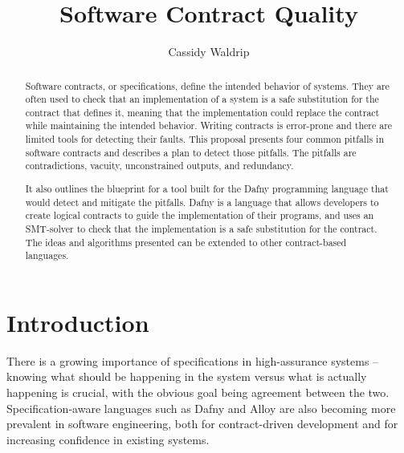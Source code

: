 \documentclass{article}
\title{Software Contract Quality}
\author{Cassidy Waldrip}
\newif\ifcomments
\newcommand{\cass}[1]{\ifcomments\textcolor{blue}{cass: #1}\fi}
\begin{document}
\maketitle

\begin{abstract}

Software contracts, or specifications, define the intended behavior of systems. They are often used to check
that an implementation of a system is a safe substitution for the contract that defines it, meaning that the implementation could replace the contract while 
maintaining the intended behavior. 
Writing contracts is error-prone and there are limited tools for detecting their faults. This proposal presents four common
pitfalls in software contracts and describes a plan to detect those pitfalls. The pitfalls are contradictions, vacuity, unconstrained outputs, and 
redundancy.
\cass{should I explain the pitfalls at all here, or just state them?}
It also outlines the blueprint for a tool built for the Dafny programming language that would detect and mitigate the pitfalls. Dafny is a language that allows 
developers to create logical contracts to guide the implementation of their programs, and uses an SMT-solver to check that the implementation is a 
safe substitution for the contract. The ideas
and algorithms presented can be extended to other contract-based languages.

\end{abstract}

\section{Introduction}

There is a growing importance of specifications in high-assurance systems – knowing what should be happening
in the system versus what is actually happening is crucial, with the obvious goal being agreement
between the two. Specification-aware languages such as Dafny \cite{leino2010dafny} and Alloy \cite{jackson2002alloy} are also becoming more prevalent in
software engineering, both for contract-driven development and for increasing confidence in existing systems.
\end{document}
